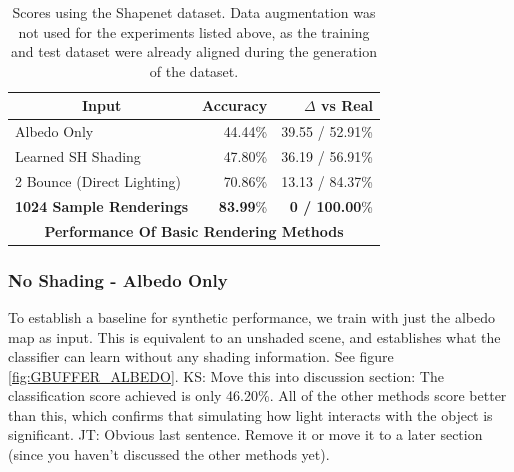 \documentclass[10pt,twocolumn,letterpaper]{article}
\newcommand{\kris}[1]{{\color{red} KS: #1}}
\newcommand{\tompson}[1]{{\color{green} JT: #1}}
\begin{document}
\begin{table}[]
\centering
\label{tblnonGI}
\begin{tabular}{|l|r|r|}
\hline
\multicolumn{1}{|c|}{\textbf{Input}}
& \multicolumn{1}{r|}{\textbf{Accuracy}}
& \multicolumn{1}{r|}{\textbf{$\Delta$ vs Real}} \\ \hline
Albedo Only 				&44.44\%	& 39.55 / 52.91\%	\\
Learned SH Shading			&47.80\%	& 36.19 / 56.91\%	\\
2 Bounce (Direct Lighting)	&70.86\%	& 13.13 / 84.37\%   \\
\textbf{1024 Sample Renderings}		& \textbf{83.99}\%	& \textbf{0 / 100.00}\%	\\ \hline
\multicolumn{3}{|c|}{\textbf{Performance Of Basic Rendering Methods}}	\\ \hline
\end{tabular}
\caption{Scores using the Shapenet dataset. Data augmentation was not used for the experiments listed above, as the training and test dataset were already aligned during the generation of the dataset.} 
\end{table}



\subsubsection{No Shading - Albedo Only}
To establish a baseline for synthetic performance, we train with just the albedo map as input.  This is equivalent to an unshaded scene, and establishes what the classifier can learn without any shading information. See figure \ref{fig:GBUFFER_ALBEDO}.  \kris{Move this into discussion section: The classification score achieved is only 46.20\%. All of the other methods score better than this, which confirms that simulating how light interacts with the object is significant.} \tompson{Obvious last sentence. Remove it or move it to a later section (since you haven't discussed the other methods yet).}
\end{document}
